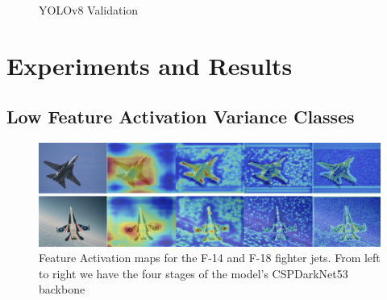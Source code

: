 \documentclass[10pt,twocolumn,letterpaper]{article}
\begin{document}
\begin{figure}[h]
    \centering
    \qquad
    \caption{YOLOv8 Validation}%
    \label{fig:Model_Evaluation}
\end{figure}

\section{Experiments and Results}
\subsection{Low Feature Activation Variance Classes}

\begin{figure}[h]
    \centering
    \includegraphics[width=1.0\textwidth]{figures/F14vsF18.png}
    \caption{Feature Activation maps for the F-14 and F-18 fighter jets. From left to right we have the four stages of the model’s
CSPDarkNet53 backbone}
    \label{fig:F14vsF18}
\end{figure}
\end{document}
